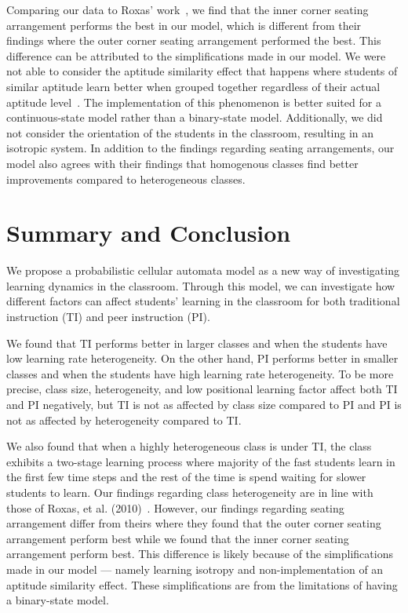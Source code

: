 \documentclass[twocolumn,secnumarabic,amssymb, nobibnotes, aps, prd]{revtex4-2}
\begin{document}
        Comparing our data to Roxas' work~\cite{roxas2010seating}, we find that the inner corner seating arrangement performs the best in our model, which is different from their findings where the outer corner seating arrangement performed the best.
        This difference can be attributed to the simplifications made in our model.
        We were not able to consider the aptitude similarity effect that happens where students of similar aptitude learn better when grouped together regardless of their actual aptitude level~\cite{smith2009peer}.
        The implementation of this phenomenon is better suited for a continuous-state model rather than a binary-state model.
        Additionally, we did not consider the orientation of the students in the classroom, resulting in an isotropic system.
        In addition to the findings regarding seating arrangements, our model also agrees with their findings that homogenous classes find better improvements compared to heterogeneous classes.
    
\section{Summary and Conclusion}
    We propose a probabilistic cellular automata model as a new way of investigating learning dynamics in the classroom.
    Through this model, we can investigate how different factors can affect students' learning in the classroom for both traditional instruction (TI) and peer instruction (PI).

    We found that TI performs better in larger classes and when the students have low learning rate heterogeneity.
    On the other hand, PI performs better in smaller classes and when the students have high learning rate heterogeneity.
    To be more precise, class size, heterogeneity, and low positional learning factor affect both TI and PI negatively, but TI is not as affected by class size compared to PI and PI is not as affected by heterogeneity compared to TI.

    We also found that when a highly heterogeneous class is under TI, the class exhibits a two-stage learning process where majority of the fast students learn in the first few time steps and the rest of the time is spend waiting for slower students to learn. Our findings regarding class heterogeneity are in line with those of Roxas, et al. (2010)~\cite{roxas2010seating}.
    However, our findings regarding seating arrangement differ from theirs where they found that the outer corner seating arrangement perform best while we found that the inner corner seating arrangement perform best.
    This difference is likely because of the simplifications made in our model --- namely learning isotropy and non-implementation of an aptitude similarity effect.
    These simplifications are from the limitations of having a binary-state model.
\end{document}

